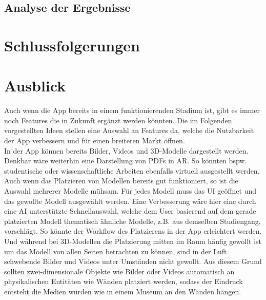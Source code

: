 \documentclass[12pt,a4paper]{article}
\begin{document}
\subsection{Analyse der Ergebnisse}
\section{Schlussfolgerungen}
\section{Ausblick}
Auch wenn die App bereits in einem funktionierenden Stadium ist, gibt es immer noch Features die in Zukunft ergänzt werden könnten. Die im Folgenden vorgestellten Ideen stellen eine Auswahl an Features da, welche die Nutzbarkeit der App verbessern und für einen breiteren Markt öffnen.\\
In der App können bereits Bilder, Videos und 3D-Modelle dargestellt werden. Denkbar wäre weiterhin eine Darstellung von PDFs in AR. So könnten bspw. studentische oder wissenschaftliche Arbeiten ebenfalls virtuell ausgestellt werden.\\
Auch wenn das Platzieren von Modellen bereits gut funktioniert, so ist die Auswahl mehrerer Modelle mühsam. Für jedes Modell muss das UI geöffnet und das gewollte Modell ausgewählt werden. Eine Verbesserung wäre hier eine durch eine AI unterstützte Schnellauswahl, welche dem User basierend auf dem gerade platzierten Modell thematisch ähnliche Modelle, z.B. aus demselben Studiengang, vorschlägt. So könnte der Workflow des Platzierens in der App erleichtert werden.\\
Und während bei 3D-Modellen die Platzierung mitten im Raum häufig gewollt ist um das Modell von allen Seiten betrachten zu können, sind in der Luft schwebende Bilder und Videos unter Umständen nicht gewollt. Aus diesem Grund sollten zwei-dimensionale Objekte wie Bilder oder Videos automatisch an physikalischen Entitäten wie Wänden platziert werden, sodass der Eindruck entsteht die Medien würden wie in einem Museum an den Wänden hängen.\\
\end{document}
